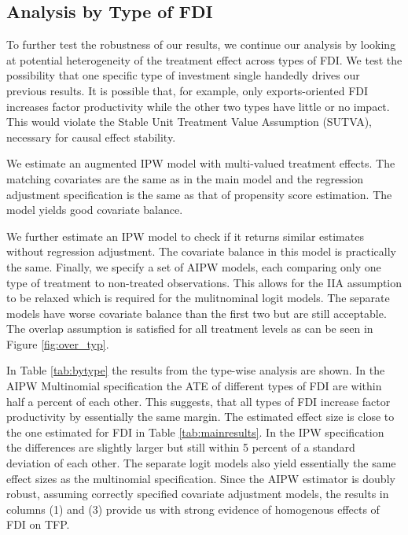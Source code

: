 \documentclass[a4paper,11pt]{scrartcl}
\begin{document}
\subsection{Analysis by Type of FDI}

To further test the robustness of our results, we continue our analysis by looking at potential heterogeneity of the treatment effect across types of FDI. We test the possibility that one specific type of investment single handedly drives our previous results. It is possible that, for example, only exports-oriented FDI increases factor productivity while the other two types have little or no impact. This would violate the Stable Unit Treatment Value Assumption (SUTVA), necessary for causal effect stability. 

We estimate an augmented IPW model with multi-valued treatment effects. The matching covariates are the same as in the main model and the regression adjustment specification is the same as that of propensity score estimation. The model yields good covariate balance.

We further estimate an IPW model to check if it returns similar estimates without regression adjustment. The covariate balance in this model is practically the same. Finally, we specify a set of AIPW models, each comparing only one type of treatment to non-treated observations. This allows for the IIA assumption to be relaxed which is required for the mulitnominal logit models. The separate models have worse covariate balance than the first two but are still acceptable. The overlap assumption is satisfied for all treatment levels as can be seen in Figure \ref{fig:over_typ}. 

In Table \ref{tab:bytype} the results from the type-wise analysis are shown. In the AIPW Multinomial specification the ATE of different types of FDI are within half a percent of each other. This suggests, that all types of FDI increase factor productivity by essentially the same margin. The estimated effect size is close to the one estimated for FDI in Table \ref{tab:mainresults}. In the IPW specification the differences are slightly larger but still within 5 percent of a standard deviation of each other.  The separate logit models also yield essentially the same effect sizes as the multinomial specification. Since the AIPW estimator is doubly robust, assuming correctly specified covariate adjustment models, the results in columns (1) and (3) provide us with strong evidence of homogenous effects of FDI on TFP.
\end{document}
